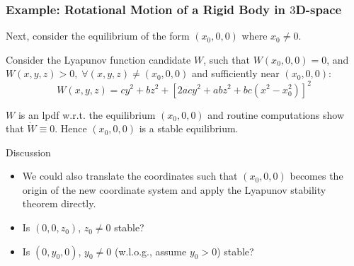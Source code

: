 \begin{frame}
    \frametitle{Example: Rotational Motion of a Rigid Body in $3$D-space}

    Next, consider the equilibrium of the form $(x_0, 0, 0)$ where $x_0 \neq 0$.

    Consider the Lyapunov function candidate $W$, such that $W(x_0, 0, 0) = 0$,
    and $W(x,y,z) > 0, \; \forall (x,y,z) \neq (x_0, 0, 0)$ and sufficiently
    near $(x_0, 0, 0)$: \[ W(x,y,z) = cy^2 + bz^2 + \left[ 2acy^2 + abz^2 +
    bc(x^2 - x_0^2) \right]^2 \]

    $W$ is an lpdf w.r.t. the equilibrium $(x_0, 0, 0)$ and routine computations 
    show that $\dot{W} \equiv 0$. Hence $(x_0, 0, 0)$ is a stable equilibrium.

    \begin{block}{Discussion}
        \begin{itemize}
            \item We could also translate the coordinates such that $(x_0, 0,
            0)$ becomes the origin of the new coordinate system and apply the
            Lyapunov stability theorem directly.
            \item Is $(0, 0, z_0)$, $z_0 \neq 0$ stable?
            \item Is $(0, y_0, 0)$, $y_0 \neq 0$ (w.l.o.g., assume $y_0 > 0$)
            stable?
        \end{itemize}
    \end{block}
\end{frame}


